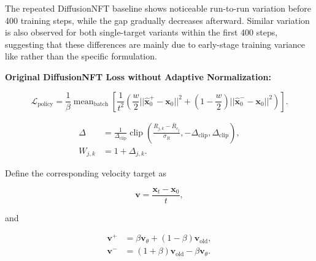\documentclass{article} %
\begin{document}
The repeated DiffusionNFT baseline shows noticeable run-to-run variation before 400 training steps, while the gap gradually decreases afterward. Similar variation is also observed for both single-target variants within the first 400 steps, suggesting that these differences are mainly due to early-stage training variance like rather than the specific formulation.





\textbf{Original DiffusionNFT Loss without Adaptive Normalization:}


\begin{equation}
\mathcal{L}_{\mathrm{policy}}
=
\frac{1}{\beta}
\operatorname{mean}_{\mathrm{batch}}
\left[
\frac{1}{t^2}
\left(
\frac{w}{2}
||\hat{\mathbf{x}}_0^+ - \mathbf{x}_0||^2
+
\left(1-\frac{w}{2}\right)
||\hat{\mathbf{x}}_0^- - \mathbf{x}_0||^2
\right)
\right].
\end{equation}

\begin{align}
\Delta
&=
\frac{1}{\Delta_{\mathrm{clip}}}
\operatorname{clip}
\left(
\frac{R_{j,k}-\bar R_{c_j}}{\sigma_R},
-\Delta_{\mathrm{clip}},
\Delta_{\mathrm{clip}}
\right),\\
W_{j,k}&=1+\Delta_{j,k}.
\end{align}


Define the corresponding velocity target as

\begin{equation}
\mathbf{v}
=
\frac{\mathbf{x}_t-\mathbf{x}_0}{t},
\end{equation}

and

\begin{align}
\mathbf{v}^+
&=
\beta\mathbf{v}_\theta
+
(1-\beta)\mathbf{v}_{\mathrm{old}}, \\
\mathbf{v}^-
&=
(1+\beta)\mathbf{v}_{\mathrm{old}}
-
\beta\mathbf{v}_\theta.
\end{align}
\end{document}
